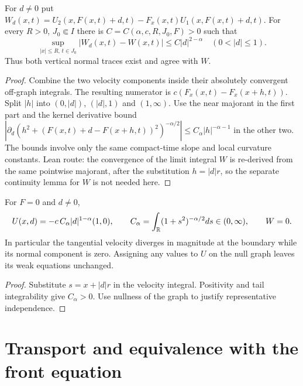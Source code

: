 \begin{lemma}
  \label{lem:c13_normal_trace}
  For $d\ne0$ put
  $W_d(x,t)=U_2(x,F(x,t)+d,t)-F_x(x,t)U_1(x,F(x,t)+d,t)$.
  For every $R>0$, $J_0\Subset I$ there is $C=C(\alpha,c,R,J_0,F)>0$ such that
  \[
    \sup_{|x|\le R,\,t\in J_0}|W_d(x,t)-W(x,t)|\le C|d|^{2-\alpha}
       \quad(0<|d|\le1).
  \]
  Thus both vertical normal traces exist and agree with $W$.
\end{lemma}
\begin{proof}
  Combine the two velocity components inside their absolutely convergent off-graph integrals.
  The resulting numerator is $c(F_x(x,t)-F_x(x+h,t))$.
  Split $|h|$ into $(0,|d|)$, $(|d|,1)$ and $(1,\infty)$.
  Use the near majorant in the first part and the kernel derivative bound
  $|\partial_d(h^2+(F(x,t)+d-F(x+h,t))^2)^{-\alpha/2}|\le C_\alpha|h|^{-\alpha-1}$
  in the other two. The bounds involve only the same compact-time slope and local curvature constants.
  Lean route: the convergence of the limit integral $W$ is re-derived from the same pointwise majorant,
  after the substitution $h=|d|r$, so the separate continuity lemma for $W$ is not needed here.
\end{proof}

\begin{lemma}
  \label{lem:c13_flat_graph_check}
  For $F=0$ and $d\ne0$,
  \[
    U(x,d)=-c\,C_\alpha|d|^{1-\alpha}(1,0),\qquad
    C_\alpha=\int_{\mathbb{R}}(1+s^2)^{-\alpha/2}ds\in(0,\infty),\qquad W=0.
  \]
  In particular the tangential velocity diverges in magnitude at the boundary while its normal
  component is zero. Assigning any values to $U$ on the null graph leaves its weak equations unchanged.
\end{lemma}
\begin{proof}
  Substitute $s=x+|d|r$ in the velocity integral. Positivity and tail integrability give $C_\alpha>0$.
  Use nullness of the graph to justify representative independence.
\end{proof}

\section{Transport and equivalence with the front equation}

